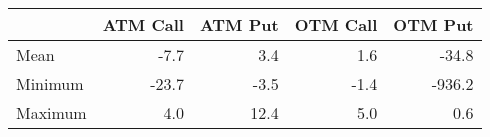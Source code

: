 \begin{tabular}{lrrrr}
\hline
         &   ATM Call &   ATM Put &   OTM Call &   OTM Put \\
\hline
 Mean    &       -7.7 &       3.4 &        1.6 &     -34.8 \\
 Minimum &      -23.7 &      -3.5 &       -1.4 &    -936.2 \\
 Maximum &        4.0 &      12.4 &        5.0 &       0.6 \\
\hline
\end{tabular}